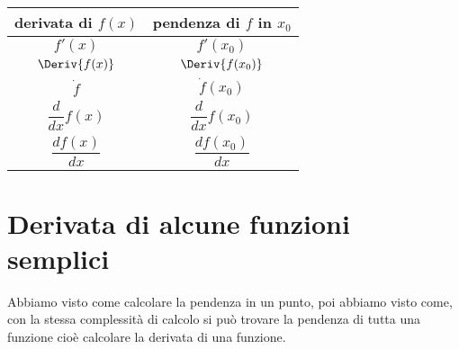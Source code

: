 % 

\begin{center}
\begin{tabular}{cc}
derivata di \(f(x)\) & pendenza di \(f\) in \(x_0\) \\
\midrule
\(f'(x)\) &  \(f'(x_0)\)\\[.3em]
\(\Deriv{f(x)}\) & \(\Deriv{f(x_0)}\)\\[.3em]
\(\dot{f}\) & \(\dot{f}(x_0)\)\\[.3em]
\(\dfrac{d}{dx}f(x)\) & \(\dfrac{d}{dx}f(x_0)\) \\[1em]
\(\dfrac{df(x)}{dx}\) & \(\dfrac{df(x_0)}{dx}\) \\[.5em]
\bottomrule
\end{tabular}
\end{center}

\section{Derivata di alcune funzioni semplici}
\label{sec:differenziazione_derivatafsemplici}
Abbiamo visto come calcolare la pendenza in un punto, 
poi abbiamo visto come, con la stessa complessità di calcolo si può 
trovare la pendenza di tutta una funzione cioè calcolare la derivata 
di una funzione.

